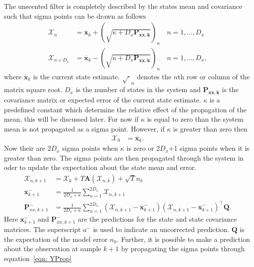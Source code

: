The unscented filter is completely described by the states mean and covariance such that sigma points can be drawn as follows\begin{align}
\label{eqn: Unscented_Transform1}
\mathbf{\mathcal{X}}_{n} &= \mathbf{\overline{x}}_{k} + (\sqrt{\kappa+D_{x}\mathbf{P_{xx,k}}})_{n} \quad n=1,\hdots,D_x\\
\label{eqn: Unscented_Transform2}
\mathbf{\mathcal{X}}_{n+D_{x}} &= \mathbf{\overline{x}}_{k} - (\sqrt{\kappa+D_{x}\mathbf{P_{xx,k}}})_{n} \quad n=1,\hdots,D_x,
\end{align} where $\mathbf{\overline{x}}_{k}$ is the current state estimate. $\sqrt{\cdot}_{n}$ denotes the $n$th row or column of the matrix square root. $D_{x}$ is the number of states in the system and $\mathbf{P_{xx,k}}$ is the covariance matrix or expected error of the current state estimate. $\kappa$ is a predefined constant which determine the relative effect of the propagation of the mean, this will be discussed later. For now if $\kappa$ is equal to zero than the system mean is not propagated as a sigma point. However, if $\kappa$ is greater than zero then \begin{align}
\mathbf{\mathcal{X}}_{0} &= \mathbf{\overline{x}}_{k}.
\end{align} Now their are 2$D_{x}$ sigma points when $\kappa$ is zero or 2$D_{x}$+1 sigma points when it is greater than zero. The sigma points are then propagated through the system in oder to update the expectation about the state mean and error. \begin{align}%
\mathbf{\mathcal{X}}_{n,k+1} &= \mathbf{\mathcal{X}}_{k}+ T\mathbf{A}(\mathbf{\mathcal{X}}_{n,k}) +\sqrt{T}{n}_{k}\\
\overline{\mathbf{x}}_{k+1}^{-} &= \frac{1}{2D_{x}+\kappa}\sum_{n=1}^{2D_{x}} \mathbf{\mathcal{X}}_{n,k+1}\\
\mathbf{P}_{xx,k+1}^{-} &= \frac{1}{2D_{x}+\kappa}\sum_{n=1}^{2D_{x}} (\mathbf{\mathcal{X}}_{n,k+1} -\mathbf{\overline{x}}_{k+1}^{-})(\mathbf{\mathcal{X}}_{n,k+1}-\mathbf{\overline{x}}_{k+1}^{-})^{\top} \mathbf{Q}.%
\end{align} Here $\overline{\mathbf{x}}_{k+1}^{-}$ and $\mathbf{P}_{xx,k+1}^{-}$ are the predictions for the state and state covariance matrices. The superscript $a^{-}$ is used to indicate an uncorrected prediction. $\mathbf{Q}$ is the expectation of the model error $n_{k}$. Further, it is possible to make a prediction about the observation at sample $k+1$ by propagating the sigma points through equation~\ref{eqn: YProp} \begin{align} %

\end{align}
